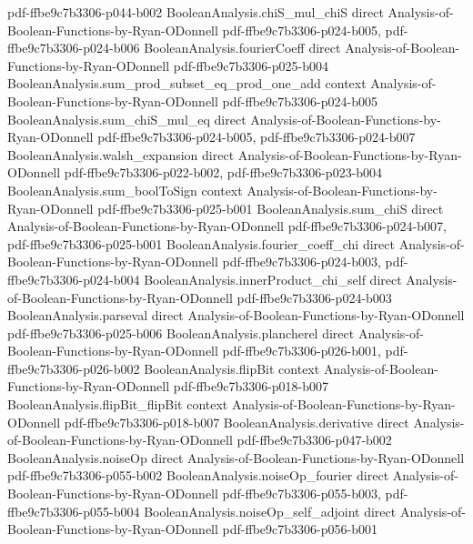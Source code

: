 \begin{theorem}
  {pdf-ffbe9c7b3306-p044-b002}
\proofstep
  {BooleanAnalysis.chiS_mul_chiS}
  {direct}
  {Analysis-of-Boolean-Functions-by-Ryan-ODonnell}
  {pdf-ffbe9c7b3306-p024-b005,
    pdf-ffbe9c7b3306-p024-b006}
\proofstep
  {BooleanAnalysis.fourierCoeff}
  {direct}
  {Analysis-of-Boolean-Functions-by-Ryan-ODonnell}
  {pdf-ffbe9c7b3306-p025-b004}
\proofstep
  {BooleanAnalysis.sum_prod_subset_eq_prod_one_add}
  {context}
  {Analysis-of-Boolean-Functions-by-Ryan-ODonnell}
  {pdf-ffbe9c7b3306-p024-b005}
\proofstep
  {BooleanAnalysis.sum_chiS_mul_eq}
  {direct}
  {Analysis-of-Boolean-Functions-by-Ryan-ODonnell}
  {pdf-ffbe9c7b3306-p024-b005,
    pdf-ffbe9c7b3306-p024-b007}
\proofstep
  {BooleanAnalysis.walsh_expansion}
  {direct}
  {Analysis-of-Boolean-Functions-by-Ryan-ODonnell}
  {pdf-ffbe9c7b3306-p022-b002,
    pdf-ffbe9c7b3306-p023-b004}
\proofstep
  {BooleanAnalysis.sum_boolToSign}
  {context}
  {Analysis-of-Boolean-Functions-by-Ryan-ODonnell}
  {pdf-ffbe9c7b3306-p025-b001}
\proofstep
  {BooleanAnalysis.sum_chiS}
  {direct}
  {Analysis-of-Boolean-Functions-by-Ryan-ODonnell}
  {pdf-ffbe9c7b3306-p024-b007,
    pdf-ffbe9c7b3306-p025-b001}
\proofstep
  {BooleanAnalysis.fourier_coeff_chi}
  {direct}
  {Analysis-of-Boolean-Functions-by-Ryan-ODonnell}
  {pdf-ffbe9c7b3306-p024-b003,
    pdf-ffbe9c7b3306-p024-b004}
\proofstep
  {BooleanAnalysis.innerProduct_chi_self}
  {direct}
  {Analysis-of-Boolean-Functions-by-Ryan-ODonnell}
  {pdf-ffbe9c7b3306-p024-b003}
\proofstep
  {BooleanAnalysis.parseval}
  {direct}
  {Analysis-of-Boolean-Functions-by-Ryan-ODonnell}
  {pdf-ffbe9c7b3306-p025-b006}
\proofstep
  {BooleanAnalysis.plancherel}
  {direct}
  {Analysis-of-Boolean-Functions-by-Ryan-ODonnell}
  {pdf-ffbe9c7b3306-p026-b001,
    pdf-ffbe9c7b3306-p026-b002}
\proofstep
  {BooleanAnalysis.flipBit}
  {context}
  {Analysis-of-Boolean-Functions-by-Ryan-ODonnell}
  {pdf-ffbe9c7b3306-p018-b007}
\proofstep
  {BooleanAnalysis.flipBit_flipBit}
  {context}
  {Analysis-of-Boolean-Functions-by-Ryan-ODonnell}
  {pdf-ffbe9c7b3306-p018-b007}
\proofstep
  {BooleanAnalysis.derivative}
  {direct}
  {Analysis-of-Boolean-Functions-by-Ryan-ODonnell}
  {pdf-ffbe9c7b3306-p047-b002}
\proofstep
  {BooleanAnalysis.noiseOp}
  {direct}
  {Analysis-of-Boolean-Functions-by-Ryan-ODonnell}
  {pdf-ffbe9c7b3306-p055-b002}
\proofstep
  {BooleanAnalysis.noiseOp_fourier}
  {direct}
  {Analysis-of-Boolean-Functions-by-Ryan-ODonnell}
  {pdf-ffbe9c7b3306-p055-b003,
    pdf-ffbe9c7b3306-p055-b004}
\proofstep
  {BooleanAnalysis.noiseOp_self_adjoint}
  {direct}
  {Analysis-of-Boolean-Functions-by-Ryan-ODonnell}
  {pdf-ffbe9c7b3306-p056-b001}

\end{theorem}
